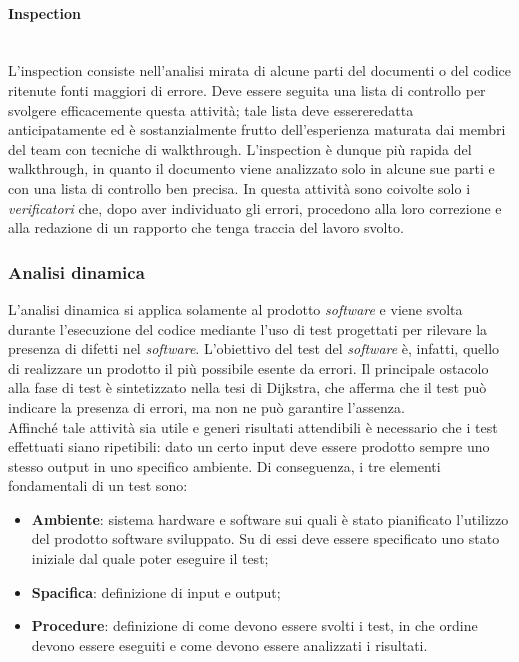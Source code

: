 \paragraph{Inspection} \mbox{} \\
L'inspection consiste nell'analisi mirata di alcune parti del documenti o del codice ritenute fonti maggiori di errore. Deve essere seguita una lista di controllo per svolgere efficacemente questa attività; tale lista deve essereredatta anticipatamente ed è sostanzialmente frutto dell'esperienza maturata dai membri del team con tecniche di walkthrough. L'inspection è dunque più rapida del walkthrough, in quanto il documento viene analizzato solo in alcune sue parti e con una lista di controllo ben precisa. In questa attività sono coivolte solo i \textit{verificatori} che, dopo aver individuato gli errori, procedono alla loro correzione e alla redazione di un rapporto che tenga traccia del lavoro svolto.

\subsubsection{Analisi dinamica}
L'analisi dinamica si applica solamente al prodotto \textit{software} e viene svolta durante l'esecuzione del codice mediante l'uso di test progettati per rilevare la presenza di difetti nel \textit{software}. L'obiettivo del test del \textit{software} è, infatti, quello di realizzare un prodotto il più possibile esente da errori. Il principale ostacolo alla fase di test è sintetizzato nella tesi di Dijkstra, che afferma che il test può indicare la presenza di errori, ma non ne può garantire l'assenza. \\
Affinché tale attività sia utile e generi risultati attendibili è necessario che i test effettuati siano ripetibili: dato un certo input deve essere prodotto sempre uno stesso output in uno specifico ambiente. Di conseguenza, i tre elementi fondamentali di un test sono:
\begin{itemize}
\item \textbf{Ambiente}: sistema hardware e software sui quali è stato pianificato l'utilizzo del prodotto software sviluppato. Su di essi deve essere specificato uno stato iniziale dal quale poter eseguire il test;
\item \textbf{Spacifica}: definizione di input e output;
\item \textbf{Procedure}: definizione di come devono essere svolti i test, in che ordine devono essere eseguiti e come devono essere analizzati i risultati.
\end{itemize}

